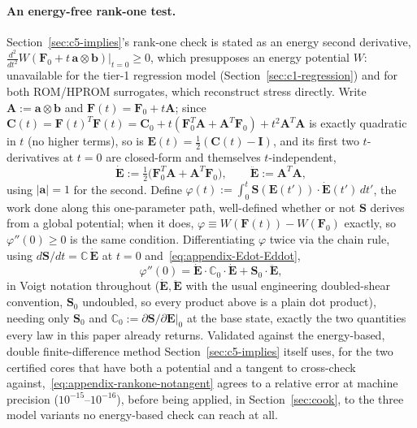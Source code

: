 \documentclass[10pt,a4paper]{article}
\begin{document}
\paragraph{An energy-free rank-one test.} Section~\ref{sec:c5-implies}'s
rank-one check is stated as an energy second derivative,
$\frac{d^2}{dt^2}W(\bm F_0+t\,\bm a\otimes\bm b)|_{t=0}\geq0$, which
presupposes an energy potential $W$: unavailable for the tier-1 regression
model (Section~\ref{sec:c1-regression}) and for both ROM/HPROM surrogates,
which reconstruct stress directly. Write $\bm A:=\bm a\otimes\bm b$ and
$\bm F(t)=\bm F_0+t\bm A$; since
$\bm C(t)=\bm F(t)^T\bm F(t)=\bm C_0+t(\bm F_0^T\bm A+\bm A^T\bm
F_0)+t^2\bm A^T\bm A$ is exactly quadratic in $t$ (no higher terms), so is
$\bm E(t)=\tfrac12(\bm C(t)-\bm I)$, and its first two $t$-derivatives at
$t=0$ are closed-form and themselves $t$-independent,
\begin{equation}
 \dot{\bm E}:=\tfrac12\big(\bm F_0^T\bm A+\bm A^T\bm F_0\big),\qquad
 \ddot{\bm E}:=\bm A^T\bm A,
 \label{eq:appendix-Edot-Eddot}
\end{equation}
using $|\bm a|=1$ for the second. Define $\varphi(t):=\int_0^t\bm
S(\bm E(t'))\cdot\dot{\bm E}(t')\,dt'$, the work done along this
one-parameter path, well-defined whether or not $\bm S$ derives from a
global potential; when it does, $\varphi\equiv W(\bm F(t))-W(\bm F_0)$
exactly, so $\varphi''(0)\geq0$ is the same condition. Differentiating
$\varphi$ twice via the chain rule, using $d\bm S/dt=\mathbb
C\,\dot{\bm E}$ at $t=0$ and~\eqref{eq:appendix-Edot-Eddot},
\begin{equation}
 \varphi''(0)=\dot{\bm E}\cdot\mathbb C_0\cdot\dot{\bm E}+\bm S_0\cdot\ddot{\bm E},
 \label{eq:appendix-rankone-notangent}
\end{equation}
in Voigt notation throughout ($\dot{\bm E},\ddot{\bm E}$ with the usual
engineering doubled-shear convention, $\bm S_0$ undoubled, so every product
above is a plain dot product), needing only $\bm S_0$ and $\mathbb
C_0:=\partial\bm S/\partial\bm E|_0$ at the base state, exactly the two
quantities every law in this paper already returns. Validated against the
energy-based, double finite-difference method Section~\ref{sec:c5-implies}
itself uses, for the two certified cores that have both a potential and a
tangent to cross-check against,~\eqref{eq:appendix-rankone-notangent}
agrees to a relative error at machine precision ($10^{-15}$--$10^{-16}$),
before being applied, in Section~\ref{sec:cook}, to the three model
variants no energy-based check can reach at all.
\end{document}
